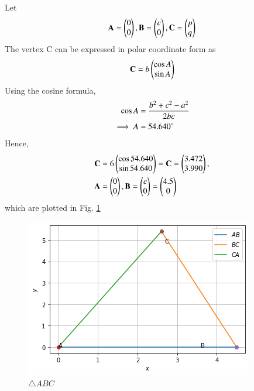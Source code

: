 Let 
\begin{align}
\label{tri/10/eq:tri_basic}
\mathbf{A} = \begin{pmatrix}0\\0\end{pmatrix}, \mathbf{B} = \begin{pmatrix}c\\0\end{pmatrix}, \mathbf{C} = \begin{pmatrix}p\\q\end{pmatrix}
\end{align}
%
The vertex C can be expressed in polar coordinate form as 
\begin {align}
\mathbf{C} = b\begin{pmatrix}\cos A\\ \sin A\end{pmatrix}
\end{align}
Using the cosine formula, 
\begin{align}
\cos A &= \frac{b^2+c^2-a^2}{2bc}
\\
\implies A &= 54.640 \degree
\end{align}
Hence, 
\begin{align}
\mathbf{C} &= 6\begin{pmatrix}\cos 54.640 \\ \sin 54.640 \end{pmatrix} = 
\mathbf{C} =\begin{pmatrix}3.472\\3.990\end{pmatrix}, 
\\
\mathbf{A} &= \begin{pmatrix}0\\0\end{pmatrix}, \mathbf{B} =\begin{pmatrix}c\\0\end{pmatrix} = \begin{pmatrix}4.5\\0\end{pmatrix}
\end{align}
which are plotted in Fig. \ref{tri/10/fig:triangle ABC}
\begin{figure}[ht]
    \centering
    \includegraphics[width=\columnwidth]{solutions/triangle/10/download .png}
    \caption{ $\triangle ABC$}
    \label{tri/10/fig:triangle ABC}
\end{figure}
